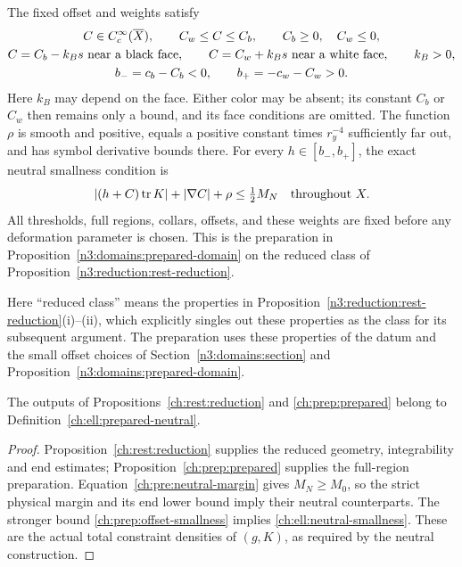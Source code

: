 \begin{definition}
The fixed offset and weights satisfy
\begin{gather*}
 C\in C_c^\infty(\overline X),\qquad C_w\le C\le C_b,
 \qquad C_b\ge0,\quad C_w\le0,\\
 C=C_b-k_Bs\ \hbox{near a black face},\qquad
 C=C_w+k_Bs\ \hbox{near a white face},\qquad k_B>0,\\
 b_-=c_b-C_b<0,\qquad b_+=-c_w-C_w>0.
\end{gather*}
Here $k_B$ may depend on the face.  Either color may be absent; its
constant $C_b$ or $C_w$ then remains only a bound, and its face
conditions are omitted.  The function $\rho$ is smooth and positive,
equals a positive constant times $r_y^{-4}$ sufficiently far out,
and has symbol derivative bounds there.  For every
$h\in[b_-,b_+]$, the exact neutral smallness condition is
\begin{equation}\label{ch:ell:neutral-smallness}
 |(h+C)\operatorname{tr} K|+|\nabla C|+\rho\le\tfrac12 M_N
 \quad\hbox{throughout }X.
\end{equation}
All thresholds, full regions, collars, offsets, and these weights are
fixed before any deformation parameter is chosen.  This is the
preparation in Proposition~\ref{n3:domains:prepared-domain} on the reduced
class of Proposition~\ref{n3:reduction:rest-reduction}.
\end{definition}

Here ``reduced class'' means the properties in
Proposition~\ref{n3:reduction:rest-reduction}\textup{(i)--(ii)}, which
explicitly singles out these properties as the class for its subsequent
argument. The preparation uses these properties of the datum and the
small offset choices of Section~\ref{n3:domains:section} and
Proposition~\ref{n3:domains:prepared-domain}.

\begin{lemma}
\label{ch:ell:hypothesis-check}
The outputs of Propositions~\ref{ch:rest:reduction} and
\ref{ch:prep:prepared} belong to Definition~\ref{ch:ell:prepared-neutral}.
\end{lemma}
\begin{proof}
Proposition~\ref{ch:rest:reduction} supplies the reduced geometry,
integrability and end estimates; Proposition~\ref{ch:prep:prepared}
supplies the full-region preparation. Equation~\eqref{ch:pre:neutral-margin}
gives $M_N\ge M_0$, so the strict physical margin and its end lower
bound imply their neutral counterparts. The stronger bound
\eqref{ch:prep:offset-smallness} implies \eqref{ch:ell:neutral-smallness}.
These are the actual total constraint densities of $(g,K)$, as
required by the neutral construction.
\end{proof}

